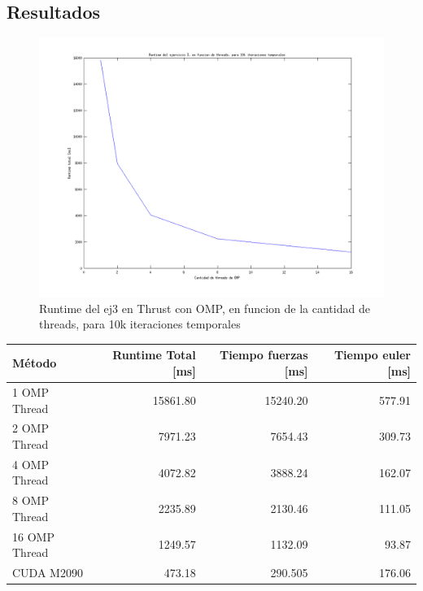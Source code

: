 \subsection{Resultados}
 \begin{figure}[H]
 \begin {center}
 \includegraphics[width=\hrwidth]{plots/ej3omp.png}
 \end {center}
 \caption{Runtime del ej3 en Thrust con OMP, en funcion de la cantidad de threads, para 10k iteraciones temporales}
 \label{fig:ej3OMP}
 \end{figure}

 \begin{table} [H]
    \begin{tabular}{l|r|r|r}
        \textbf{M\'etodo} & \textbf{ Runtime Total [ms]}& \textbf{Tiempo fuerzas [ms]} & \textbf{Tiempo euler [ms]}\\ \hline
        1 OMP Thread         & 15861.80      & 15240.20  & 577.91\\
   2 OMP Thread          & 7971.23     & 7654.43 &309.73  \\
   4 OMP Thread          & 4072.82     & 3888.24 & 162.07 \\
   8 OMP Thread  & 2235.89     & 2130.46 & 111.05 \\
   16 OMP Thread & 1249.57     & 1132.09 & 93.87 \\
       CUDA M2090 & 473.18  & 290.505 & 176.06
   \end{tabular}
   
\end{table}


